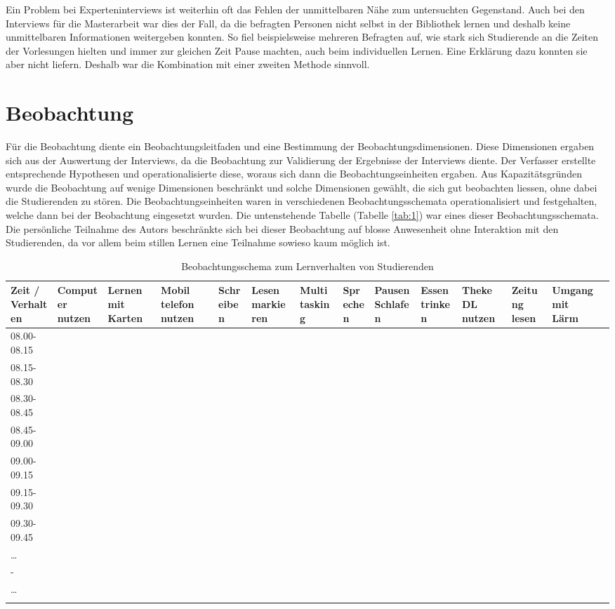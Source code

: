 \documentclass[a4paper,
fontsize=11pt,
oneside,
numbers=noperiodatend,
parskip=half-,
bibliography=totoc,
final
]{scrartcl}
\begin{document}
Ein Problem bei Experteninterviews ist weiterhin oft das Fehlen der
unmittelbaren Nähe zum untersuchten Gegenstand. Auch bei den Interviews
für die Masterarbeit war dies der Fall, da die befragten Personen nicht
selbst in der Bibliothek lernen und deshalb keine unmittelbaren
Informationen weitergeben konnten. So fiel beispielsweise mehreren
Befragten auf, wie stark sich Studierende an die Zeiten der Vorlesungen
hielten und immer zur gleichen Zeit Pause machten, auch beim
individuellen Lernen. Eine Erklärung dazu konnten sie aber nicht
liefern. Deshalb war die Kombination mit einer zweiten Methode sinnvoll.

\section*{Beobachtung}\label{beobachtung}

Für die Beobachtung diente ein Beobachtungsleitfaden und eine Bestimmung
der Beobachtungsdimensionen. Diese Dimensionen ergaben sich aus der
Auswertung der Interviews, da die Beobachtung zur Validierung der
Ergebnisse der Interviews diente. Der Verfasser erstellte entsprechende
Hypothesen und operationalisierte diese, woraus sich dann die
Beobachtungseinheiten ergaben. Aus Kapazitätsgründen wurde die
Beobachtung auf wenige Dimensionen beschränkt und solche Dimensionen
gewählt, die sich gut beobachten liessen, ohne dabei die Studierenden zu
stören. Die Beobachtungseinheiten waren in verschiedenen
Beobachtungsschemata operationalisiert und festgehalten, welche dann bei
der Beobachtung eingesetzt wurden. Die untenstehende Tabelle (Tabelle \vref{tab:1})
war eines dieser Beobachtungsschemata. Die persönliche Teilnahme des
Autors beschränkte sich bei dieser Beobachtung auf blosse Anwesenheit
ohne Interaktion mit den Studierenden, da vor allem beim stillen Lernen
eine Teilnahme sowieso kaum möglich ist.

\begin{tiny}
\begin{longtable}[c]{p{0.7cm}p{0.7cm}p{0.7cm}p{0.7cm}p{0.7cm}p{0.7cm}p{0.7cm}p{0.7cm}p{0.7cm}p{0.7cm}p{0.7cm}p{0.7cm}p{0.7cm}p{0.7cm}}
\toprule
Zeit / Verhalten & Computer nutzen & Lernen mit Karten & Mobil telefon
nutzen & Schreiben & Lesen markieren & Multi tasking & Sprechen & Pausen
Schlafen & Essen trinken & Theke DL nutzen & Zeitung lesen & Umgang mit
Lärm\tabularnewline
\midrule
\endhead
08.00-08.15 & & & & & & & & & & & &\tabularnewline
08.15-08.30 & & & & & & & & & & & &\tabularnewline
08.30-08.45 & & & & & & & & & & & &\tabularnewline
08.45-09.00 & & & & & & & & & & & &\tabularnewline
09.00-09.15 & & & & & & & & & & & &\tabularnewline
09.15-09.30 & & & & & & & & & & & &\tabularnewline
09.30-09.45 & & & & & & & & & & & &\tabularnewline
\ldots{} & & & & & & & & & & & &\tabularnewline
- & & & & & & & & & & & &\tabularnewline
\ldots{} & & & & & & & & & & & &\tabularnewline
\bottomrule
\caption{Beobachtungsschema zum Lernverhalten von Studierenden
}
\label{tab:1}
\end{longtable}
\end{tiny}
\end{document}
